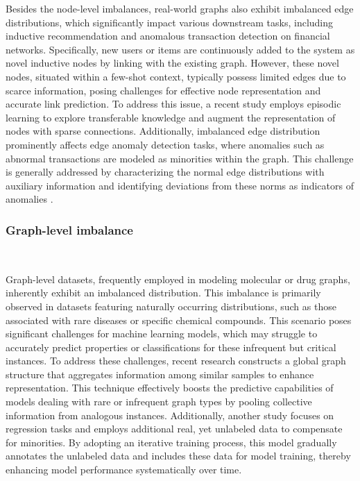 Besides the node-level imbalances, real-world graphs also exhibit imbalanced edge distributions, which significantly impact various downstream tasks, including inductive recommendation and anomalous transaction detection on financial networks. Specifically, new users or items are continuously added to the system as novel inductive nodes by linking with the existing graph. However, these novel nodes, situated within a few-shot context, typically possess limited edges due to scarce information, posing challenges for effective node representation and accurate link prediction. To address this issue, a recent study \cite{zhu2023few} employs episodic learning to explore transferable knowledge and augment the representation of nodes with sparse connections. Additionally, imbalanced edge distribution prominently affects edge anomaly detection tasks, where anomalies such as abnormal transactions are modeled as minorities within the graph. This challenge is generally addressed by characterizing the normal edge distributions \cite{zhu2023few} with auxiliary information \cite{liu2022deep} and identifying deviations from these norms as indicators of anomalies \cite{li2021live}.


\subsubsection{Graph-level imbalance}\ 

Graph-level datasets, frequently employed in modeling molecular or drug graphs, inherently exhibit an imbalanced distribution. This imbalance is primarily observed in datasets featuring naturally occurring distributions, such as those associated with rare diseases or specific chemical compounds. This scenario poses significant challenges for machine learning models, which may struggle to accurately predict properties or classifications for these infrequent but critical instances. To address these challenges, recent research \cite{wang2022imbalanced} constructs a global graph structure that aggregates information among similar samples to enhance representation. This technique effectively boosts the predictive capabilities of models dealing with rare or infrequent graph types by pooling collective information from analogous instances. Additionally, another study \cite{liu2023semi} focuses on regression tasks and employs additional real, yet unlabeled data to compensate for minorities. By adopting an iterative training process, this model gradually annotates the unlabeled data and includes these data for model training, thereby enhancing model performance systematically over time.